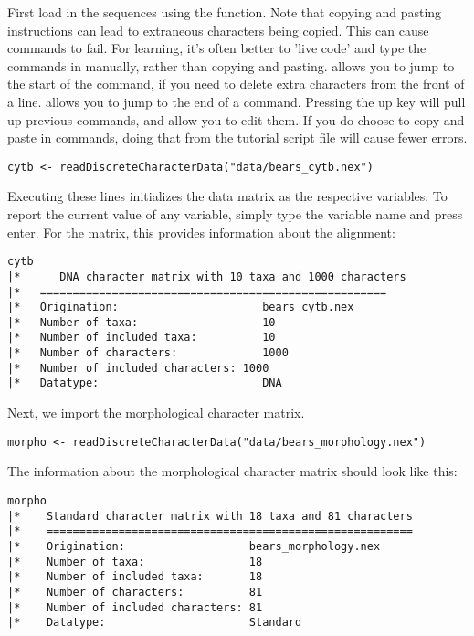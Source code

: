 First load in the sequences using the  function. Note that copying and pasting instructions can lead to extraneous characters being copied. This can cause commands to fail. For learning, it's often better to 'live code' and type the commands in manually, rather than copying and pasting.  allows you to jump to the start of the command, if you need to delete extra characters from the front of a line.  allows you to jump to the end of a command. Pressing the up key will pull up previous commands, and allow you to edit them. If you do choose to copy and paste in commands, doing that from the tutorial script file will cause fewer errors. 

{\tt \begin{snugshade*}
\begin{lstlisting}
cytb <- readDiscreteCharacterData("data/bears_cytb.nex") 
\end{lstlisting}
\end{snugshade*}}
Executing these lines initializes the data matrix as the respective \Rev variables. 
To report the current value of any variable, simply type the variable name and press enter. For the  matrix, this provides information about the alignment:
{\tt \begin{snugshade*}
\begin{lstlisting}
cytb
|*      DNA character matrix with 10 taxa and 1000 characters
|*   =====================================================
|*   Origination:                      bears_cytb.nex
|*   Number of taxa:                   10
|*   Number of included taxa:          10
|*   Number of characters:             1000
|*   Number of included characters: 1000
|*   Datatype:                         DNA
\end{lstlisting}
\end{snugshade*}}

Next, we import the morphological character matrix. 
{\tt \begin{snugshade*}
\begin{lstlisting}
morpho <- readDiscreteCharacterData("data/bears_morphology.nex")
\end{lstlisting}
\end{snugshade*}}

The information about the morphological character matrix should look like this:

{\tt \begin{snugshade*}
\begin{lstlisting}
morpho
|*    Standard character matrix with 18 taxa and 81 characters
|*    ========================================================
|*    Origination:                   bears_morphology.nex
|*    Number of taxa:                18
|*    Number of included taxa:       18
|*    Number of characters:          81
|*    Number of included characters: 81
|*    Datatype:                      Standard
\end{lstlisting}
\end{snugshade*}}

